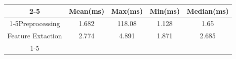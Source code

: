 \documentclass{standalone}
\begin{document}
 
 \begin{tabular}{|c |c |c |c |c |}
\cline{2-5}\cline{2-5} \multicolumn{1}{c |}{ } & Mean(ms) & Max(ms) & Min(ms) & Median(ms)\\ 
\cline{1-5}Preprocessing & 1.682 & 118.08 & 1.128 & 1.65\\ 
 \hhline{|=|=|=|=|=|}Feature Extaction & 2.774 & 4.891 & 1.871 & 2.685\\ 
 \cline{1-5}\hline \end{tabular}
 
\end{document}
